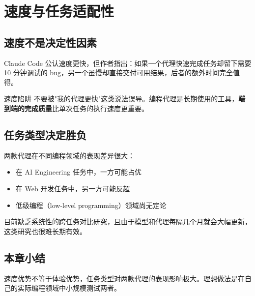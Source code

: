 \section{速度与任务适配性}

\subsection{速度不是决定性因素}

Claude Code 公认速度更快，但作者指出：如果一个代理快速完成任务却留下需要 10 分钟调试的 bug，另一个虽慢却直接交付可用结果，后者的额外时间完全值得。

\begin{warningbox}{速度陷阱}
不要被"我的代理更快"这类说法误导。编程代理是长期使用的工具，\textbf{端到端的完成质量}比单次任务的执行速度更重要。
\end{warningbox}

\subsection{任务类型决定胜负}

两款代理在不同编程领域的表现差异很大：

\begin{itemize}
    \item 在 AI Engineering 任务中，一方可能占优
    \item 在 Web 开发任务中，另一方可能反超
    \item 低级编程（low-level programming）领域尚无定论
\end{itemize}

目前缺乏系统性的跨任务对比研究，且由于模型和代理每隔几个月就会大幅更新，这类研究也很难长期有效。

\subsection{本章小结}

速度优势不等于体验优势，任务类型对两款代理的表现影响极大。理想做法是在自己的实际编程领域中小规模测试两者。

